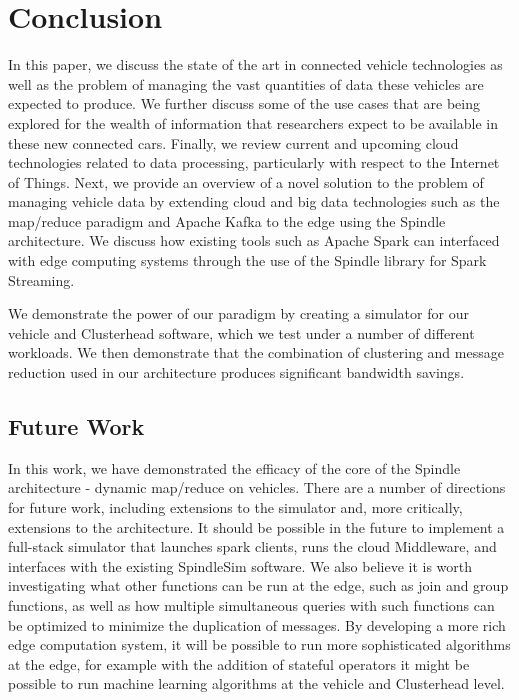 \documentclass{thesis}
\begin{document}
\chapter{Conclusion}
    In this paper, we discuss the state of the art in connected vehicle technologies as well as the problem
    of managing the vast quantities of data these vehicles are expected to produce. We further discuss
    some of the use cases that are being explored for the wealth of information that researchers expect
    to be available in these new connected cars. Finally, we review current and upcoming cloud technologies
    related to data processing, particularly with respect to the Internet of Things. Next, we provide an
    overview of a novel solution to the problem of managing vehicle data by extending cloud and big data 
    technologies such as the map/reduce paradigm and Apache Kafka to the edge using the Spindle architecture.
    We discuss how existing tools such as Apache Spark can interfaced with edge computing systems through
    the use of the Spindle library for Spark Streaming.

    We demonstrate the power of our paradigm by creating a simulator for our vehicle and Clusterhead software,
    which we test under a number of different workloads. We then demonstrate that the combination of clustering
    and message reduction used in our architecture produces significant bandwidth savings.

\section*{Future Work}
    In this work, we have demonstrated the efficacy of the core of the Spindle architecture - dynamic map/reduce
    on vehicles. There are a number of directions for future work, including extensions to the simulator and, 
    more critically, extensions to the architecture.
    It should be possible in the future to implement a full-stack simulator that launches spark clients, runs
    the cloud Middleware, and interfaces with the existing SpindleSim software. We also believe it is worth
    investigating what other functions can be run at the edge, such as join and group functions, as well
    as how multiple simultaneous queries with such functions can be optimized to minimize the duplication
    of messages. By developing a more rich edge computation system, it will be possible to run more sophisticated
    algorithms at the edge, for example with the addition of stateful operators it might be possible to run
    machine learning algorithms at the vehicle and Clusterhead level.
\end{document}
